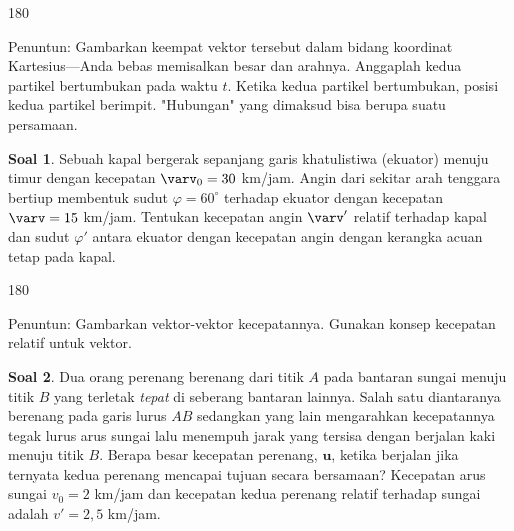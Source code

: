 \documentclass[a4paper, 11.5pt]{article}
\theoremstyle{definition}
\newtheorem{soal}{Soal}
\begin{document}
\vspace{1em}

\begin{flushright}
	\begin{rotate}{180}
		\begin{minipage}{\linewidth}
			\color{lightgray}
			Penuntun: Gambarkan keempat vektor tersebut dalam bidang koordinat Kartesius---Anda bebas memisalkan besar dan arahnya. Anggaplah kedua partikel bertumbukan pada waktu $t$. Ketika kedua partikel bertumbukan, posisi kedua partikel berimpit. "Hubungan" yang dimaksud bisa berupa suatu persamaan.
		\end{minipage}
	\end{rotate}	
\end{flushright}

\vspace{1em}

\begin{soal}
	Sebuah kapal bergerak sepanjang garis khatulistiwa (ekuator) menuju timur dengan kecepatan $\varv_0 = 30$ km/jam. Angin dari sekitar arah tenggara bertiup membentuk sudut $\varphi = 60^{\circ}$ terhadap ekuator dengan kecepatan $\varv = 15$ km/jam. Tentukan kecepatan angin $\varv'$ relatif terhadap kapal dan sudut $\varphi'$ antara ekuator dengan kecepatan angin dengan kerangka acuan tetap pada kapal.
\end{soal}

\begin{flushright}
	\begin{rotate}{180}
		\begin{minipage}{\linewidth}
			\color{lightgray}
			Penuntun: Gambarkan vektor-vektor kecepatannya. Gunakan konsep kecepatan relatif untuk vektor.
		\end{minipage}
	\end{rotate}	
\end{flushright}

\begin{soal}
	Dua orang perenang berenang dari titik $A$ pada bantaran sungai menuju titik $B$ yang terletak \textit{tepat} di seberang bantaran lainnya. Salah satu diantaranya berenang pada garis lurus $AB$ sedangkan yang lain mengarahkan kecepatannya tegak lurus arus sungai lalu menempuh jarak yang tersisa dengan berjalan kaki menuju titik $B$. Berapa besar kecepatan perenang, $\boldsymbol{u}$, ketika berjalan jika ternyata kedua perenang mencapai tujuan secara bersamaan? Kecepatan arus sungai $v_0 = 2$ km/jam dan kecepatan kedua perenang relatif terhadap sungai adalah $v' = 2{,}5$ km/jam.
\end{soal}
\end{document}
